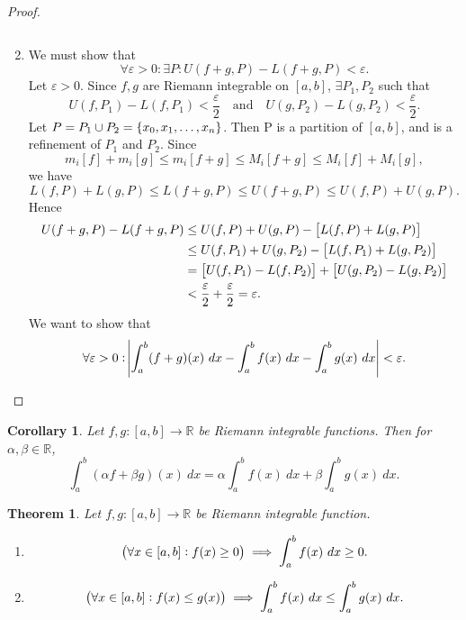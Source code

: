 \documentclass[12pt,openany]{book}
\newtheorem{theorem}{Theorem}[chapter]
\newtheorem{corollary}{Corollary}[theorem]
\theoremstyle{definition}
\newcommand{\R}{\mathbb{R}}
\begin{document}
\begin{proof}
\begin{enumerate}[(1)]
\[			\]
			\item We must show that \[
			\forall\varepsilon>0:\exists P:U(f+g,P)-L(f+g,P)<\varepsilon.
			\] Let \(\varepsilon>0\). Since \(f,g\) are Riemann integrable on \([a,b]\), \(\exists P_1,P_2\) such that \[
			U(f,P_1)-L(f,P_1)<\frac{\varepsilon}{2}\quad\text{and}\quad U(g,P_2)-L(g,P_2)<\frac{\varepsilon}{2}.
			\] Let \(P=P_1\cup P_2=\set{x_0,x_1,\dots,x_n}\). Then P is a partition of \([a,b]\), and is a refinement of \(P_1\) and \(P_2\).
			Since \[
			m_i[f]+m_i[g]\leq m_i[f+g]\leq M_i[f+g]\leq M_i[f]+M_i[g],
			\] we have \[
			L(f,P)+L(g,P)\leq L(f+g,P)\leq U(f+g,P)\leq U(f,P)+U(g,P). 
			\] Hence \begin{align*}
				U(f+g,P)-L(f+g,P)&\leq U(f,P)+U(g,P)-\sbr{L(f,P)+L(g,P)}\\
				&\leq U(f,P_1)+U(g,P_2)-\sbr{L(f,P_1)+L(g,P_2)}\\
				&=\sbr{U(f,P_1)-L(f,P_2)}+\sbr{U(g,P_2)-L(g,P_2)}\\
				&<\frac{\varepsilon}{2}+\frac{\varepsilon}{2}=\varepsilon.
			\end{align*}
			We want to show that \[
			\forall\varepsilon>0:\abs{\int_a^b(f+g)(x)\ dx- \int_a^bf(x)\ dx- \int_a^b g(x)\ dx}<\varepsilon.
			\]
		\end{enumerate}
	\end{proof}
	\vspace{4pt}
	\begin{tcolorbox}[colframe=corcolor, title={\color{white}\bf }]
		\begin{corollary}
			Let \(f,g:[a,b]\to\R\) be Riemann integrable functions. Then for \(\alpha,\beta\in\R\), \[
			\int_a^b(\alpha f+\beta g)(x)\ dx = \alpha\int_a^b f(x)\ dx+\beta\int_a^b g(x)\ dx.
			\]
		\end{corollary}
	\end{tcolorbox}
	\newpage
	\begin{tcolorbox}[colframe=thmcolor, title={\color{white}\bf }]
		\begin{theorem}
			Let $f,g:[a,b]\to\R$ be Riemann integrable function.
			\begin{enumerate}[(1)]
				\item \[
				\del{\forall x\in[a,b]:f(x)\geq 0}\implies\int_a^bf(x)\ dx\geq 0.
				\]
				\item \[
				\del{\forall x\in[a,b]:f(x)\leq g(x)}\implies\int_a^bf(x)\ dx\leq \int_a^bg(x)\ dx.
				\]
			\end{enumerate}
		\end{theorem}
	\end{tcolorbox}
\end{document}
